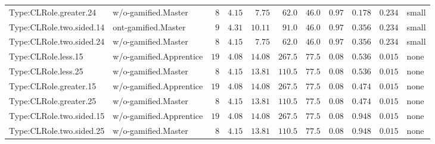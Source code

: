 \documentclass[6pt,a4paper]{article}
\begin{document}
{\begin{longtable}{llrrrrrrrrl}
Type:CLRole.greater.24&w/o-gamified.Master&$ 8$&$4.15$&$ 7.75$&$ 62.0$&$ 46.0$&$ 0.97$&$0.178$&$0.234$&small\tabularnewline
Type:CLRole.two.sided.14&ont-gamified.Master&$ 9$&$4.31$&$10.11$&$ 91.0$&$ 46.0$&$ 0.97$&$0.356$&$0.234$&small\tabularnewline
Type:CLRole.two.sided.24&w/o-gamified.Master&$ 8$&$4.15$&$ 7.75$&$ 62.0$&$ 46.0$&$ 0.97$&$0.356$&$0.234$&small\tabularnewline
Type:CLRole.less.15&w/o-gamified.Apprentice&$19$&$4.08$&$14.08$&$267.5$&$ 77.5$&$ 0.08$&$0.536$&$0.015$&none\tabularnewline
Type:CLRole.less.25&w/o-gamified.Master&$ 8$&$4.15$&$13.81$&$110.5$&$ 77.5$&$ 0.08$&$0.536$&$0.015$&none\tabularnewline
Type:CLRole.greater.15&w/o-gamified.Apprentice&$19$&$4.08$&$14.08$&$267.5$&$ 77.5$&$ 0.08$&$0.474$&$0.015$&none\tabularnewline
Type:CLRole.greater.25&w/o-gamified.Master&$ 8$&$4.15$&$13.81$&$110.5$&$ 77.5$&$ 0.08$&$0.474$&$0.015$&none\tabularnewline
\newpage
Type:CLRole.two.sided.15&w/o-gamified.Apprentice&$19$&$4.08$&$14.08$&$267.5$&$ 77.5$&$ 0.08$&$0.948$&$0.015$&none\tabularnewline
Type:CLRole.two.sided.25&w/o-gamified.Master&$ 8$&$4.15$&$13.81$&$110.5$&$ 77.5$&$ 0.08$&$0.948$&$0.015$&none\tabularnewline
\hline
\end{longtable}}
\end{document}
